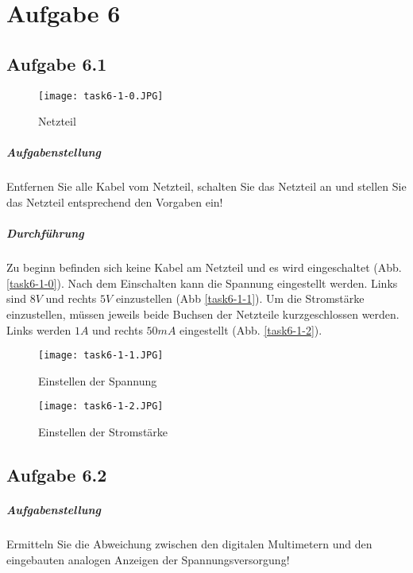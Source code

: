 \chapter{Aufgabe 6}
\section{Aufgabe 6.1}

\begin{wrapfigure}[13]{r}{.3\textwidth}
	\texttt{[image: task6-1-0.JPG]}
	\caption{Netzteil}
	\label{task6-1-0}
\end{wrapfigure}

\paragraph{Aufgabenstellung}
Entfernen Sie alle Kabel vom Netzteil, schalten Sie das Netzteil an und stellen Sie das Netzteil entsprechend den Vorgaben ein!

\paragraph{Durchführung}
Zu beginn befinden sich keine Kabel am Netzteil und es wird eingeschaltet (Abb. \vref{task6-1-0}). Nach dem Einschalten kann die Spannung eingestellt werden. Links sind $8V$ und rechts $5V$ einzustellen (Abb \vref{task6-1-1}). Um die Stromstärke einzustellen, müssen jeweils beide Buchsen der Netzteile kurzgeschlossen werden. Links werden $1A$ und rechts $50mA$ eingestellt (Abb. \vref{task6-1-2}).

\begin{figure}
	\begin{minipage}[c]{0.5\textwidth}
		\texttt{[image: task6-1-1.JPG]}
		\caption{Einstellen der Spannung}
		\label{task6-1-1}
	\end{minipage}
	\hfill
	\begin{minipage}[c]{0.44\textwidth}
		\texttt{[image: task6-1-2.JPG]}
		\caption{Einstellen der Stromstärke}
		\label{task6-1-2}
	\end{minipage}
\end{figure}

\section{Aufgabe 6.2}
\paragraph{Aufgabenstellung}
Ermitteln Sie die Abweichung zwischen den digitalen Multimetern und den eingebauten analogen Anzeigen der Spannungsversorgung!

